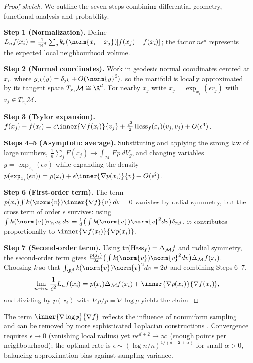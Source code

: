 \begin{proof}[Proof sketch]
We outline the seven steps combining differential geometry, functional analysis
and probability.

\textbf{Step 1 (Normalization).} Define
$L_n f(x_i) = \frac{1}{n\epsilon^d} \sum_{j} k_\epsilon(\norm{x_i - x_j})
[f(x_j) - f(x_i)]$; the factor $n\epsilon^d$ represents the expected local
neighbourhood volume.

\textbf{Step 2 (Normal coordinates).} Work in geodesic normal coordinates
centred at $x_i$, where $g_{jk}(y) = \delta_{jk} + O(\norm{y}^2)$, so the
manifold is locally approximated by its tangent space
$T_{x_i}\mathcal{M} \cong \R^d$. For nearby $x_j$ write
$x_j = \exp_{x_i}(\epsilon v_j)$ with $v_j \in T_{x_i}\mathcal{M}$.

\textbf{Step 3 (Taylor expansion).}
$f(x_j) - f(x_i) = \epsilon \inner{\nabla f(x_i)}{v_j}
+ \tfrac{\epsilon^2}{2} \Hess_f(x_i)(v_j, v_j) + O(\epsilon^3)$.

\textbf{Steps 4--5 (Asymptotic average).} Substituting and applying the strong
law of large numbers, $\frac1n \sum_j F(x_j) \to \int_{\mathcal{M}} F\, p\, dV_g$,
and changing variables $y = \exp_{x_i}(\epsilon v)$ while expanding the density
$p(\exp_{x_i}(\epsilon v)) = p(x_i) + \epsilon \inner{\nabla p(x_i)}{v} + O(\epsilon^2)$.

\textbf{Step 6 (First-order term).} The term
$p(x_i) \int k(\norm{v}) \inner{\nabla f}{v}\, dv = 0$ vanishes by radial
symmetry, but the cross term of order $\epsilon$ survives: using
$\int k(\norm{v}) v_\alpha v_\beta\, dv = \frac1d \big(\int k(\norm{v})\norm{v}^2 dv\big)
\delta_{\alpha\beta}$, it contributes proportionally to
$\inner{\nabla f(x_i)}{\nabla p(x_i)}$.

\textbf{Step 7 (Second-order term).} Using
$\operatorname{tr}(\operatorname{Hess}_f) = \Delta_{\mathcal{M}} f$ and radial symmetry, the second-order term
gives $\frac{p(x_i)}{2d}\big(\int k(\norm{v})\norm{v}^2 dv\big)
\Delta_{\mathcal{M}} f(x_i)$. Choosing $k$ so that
$\int_{\R^d} k(\norm{v})\norm{v}^2 dv = 2d$ and combining Steps 6--7,
\[
  \lim_{n\to\infty} \frac{1}{\epsilon^2} L_n f(x_i)
    = p(x_i)\Delta_{\mathcal{M}} f(x_i) + \inner{\nabla p(x_i)}{\nabla f(x_i)} ,
\]
and dividing by $p(x_i)$ with $\nabla p / p = \nabla \log p$ yields the claim.
\end{proof}

The term $\inner{\nabla \log p}{\nabla f}$ reflects the influence of nonuniform
sampling and can be removed by more sophisticated Laplacian constructions
\citep{coifman2006diffusion, hein2007graph}. Convergence requires
$\epsilon \to 0$ (vanishing local radius) yet $n\epsilon^{d+2} \to \infty$
(enough points per neighbourhood); the optimal rate is
$\epsilon \sim (\log n / n)^{1/(d+2+\alpha)}$ for small $\alpha > 0$, balancing
approximation bias against sampling variance.

